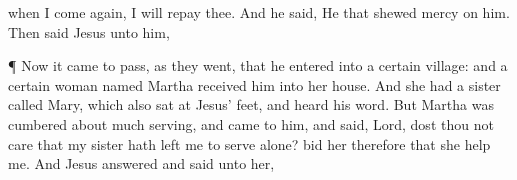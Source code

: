 {{{when
I
come again,
I
will repay
thee.}}
And he
said, He that
shewed
mercy
on
him.
Then
said
Jesus unto
him,
{}
\par }{\PP {}¶
Now it came to
pass,
as
they
went,
that
he
entered
into
a
certain
village:
and
a
certain
woman
named
Martha
received
him
into
her
house.
And
she
had a
sister
called
Mary,
which
also
sat
at
Jesus’
feet, and
heard
his
word.
But
Martha was
cumbered
about
much
serving,
and came to
him, and
said,
Lord,
dost
thou
not
care
that
my
sister hath
left
me to
serve
alone?
bid
her
therefore
that she
help
me.
And
Jesus
answered and
said unto
her,
{}

}

